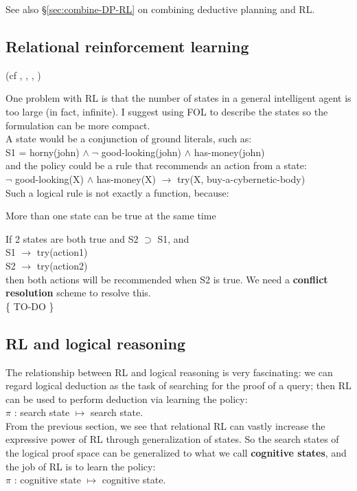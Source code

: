 See also \S\ref{sec:combine-DP-RL} on combining deductive planning and RL.

\subsection{Relational reinforcement learning}

(cf \citep*{Dzeroski1998}, \citep*{Dzeroski2001}, \citep*{Tadepalli2004}, \citep*{Driessens2005})

One problem with RL is that the number of states in a general intelligent agent is too large (in fact, infinite).  I suggest using FOL to describe the states so the formulation can be more compact.\\
A state would be a conjunction of ground literals, such as:\\
\hspace*{1cm} S1 = horny(john) $\wedge \; \neg$ good-looking(john) $\wedge$ has-money(john)\\
and the policy could be a rule that recommends an action from a state:\\
\hspace*{1cm} $\neg$ good-looking(X) $\wedge$ has-money(X) $\rightarrow$ try(X, buy-a-cybernetic-body)\\
Such a logical rule is not exactly a function, because:
\begin{compactenum}[1.]
\item More than one state can be true at the same time
\item If 2 states are both true and S2 $\supset$ S1, and\\
\hspace*{1cm} S1 $\rightarrow$ try(action1)\\
\hspace*{1cm} S2 $\rightarrow$ try(action2)\\
then both actions will be recommended when S2 is true.  We need a \textbf{conflict resolution} scheme to resolve this.\\
\{ TO-DO \} \\
\end{compactenum}

\subsection{RL and logical reasoning}

The relationship between RL and logical reasoning is very fascinating:  we can regard logical deduction as the task of searching for the proof of a query;  then RL can be used to perform deduction via learning the policy:\\
\hspace*{1cm} $\pi$ : search state $\mapsto$ search state.\\
From the previous section, we see that relational RL can vastly increase the expressive power of RL through generalization of states.  So the search states of the logical proof space can be generalized to what we call \textbf{cognitive states}, and the job of RL is to learn the policy:\\
\hspace*{1cm} $\pi$ : cognitive state $\mapsto$ cognitive state.

